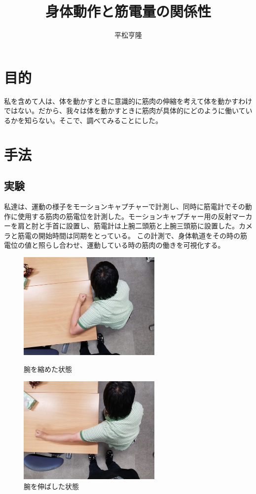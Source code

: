 \documentclass{jsarticle}
\begin{document}
\title{身体動作と筋電量の関係性}
\author{平松亨隆}
\maketitle


\section{目的}
私を含めて人は、体を動かすときに意識的に筋肉の伸縮を考えて体を動かすわけではない。だから、我々は体を動かすときに筋肉が具体的にどのように働いているかを知らない。そこで、調べてみることにした。

\section{手法}
\subsection{実験}
私達は、運動の様子をモーションキャプチャーで計測し、同時に筋電計でその動作に使用する筋肉の筋電位を計測した。モーションキャプチャー用の反射マーカーを肩と肘と手首に設置し、筋電計は上腕二頭筋と上腕三頭筋に設置した。カメラと筋電の開始時間は同期をとっている。
この計測で、身体軌道をその時の筋電位の値と照らし合わせ、運動している時の筋肉の働きを可視化する。
\begin{figure}[h]
  \begin{minipage}{0.5\hsize}
    \begin{center}
      \includegraphics[width=7cm]{images/short.jpg}
    \end{center}
    \caption{腕を縮めた状態}
    \label{shortfig}
  \end{minipage}
  \begin{minipage}{0.5\hsize}
    \begin{center}
      \includegraphics[width=7cm]{images/long.jpg}
    \end{center}
    \caption{腕を伸ばした状態}
    \label{longfig}
  \end{minipage}
\end{figure}
\end{document}
